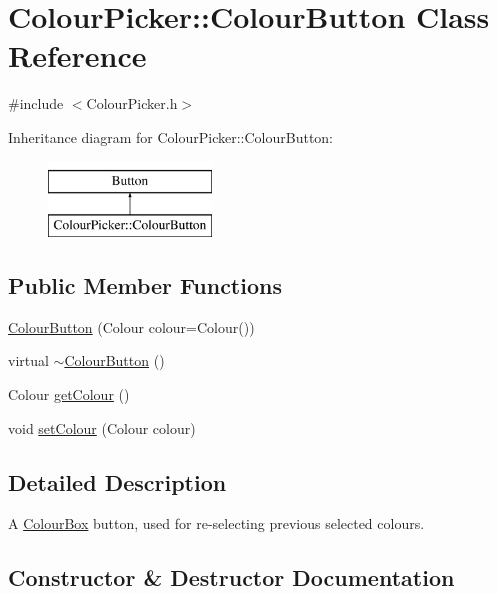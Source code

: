 \hypertarget{classColourPicker_1_1ColourButton}{}\section{Colour\+Picker\+:\+:Colour\+Button Class Reference}
\label{classColourPicker_1_1ColourButton}


{\ttfamily \#include $<$Colour\+Picker.\+h$>$}

Inheritance diagram for Colour\+Picker\+:\+:Colour\+Button\+:\begin{figure}[H]
\begin{center}
\leavevmode
\includegraphics[height=2.000000cm]{classColourPicker_1_1ColourButton}
\end{center}
\end{figure}
\subsection*{Public Member Functions}
\begin{DoxyCompactItemize}
\item 
\mbox{\hyperlink{classColourPicker_1_1ColourButton_a41e4ab540c3c4e77af02b5893d77838f}{Colour\+Button}} (Colour colour=Colour())
\item 
virtual \mbox{\hyperlink{classColourPicker_1_1ColourButton_a3c99f25e8d600d8793d99a948ae27fc2}{$\sim$\+Colour\+Button}} ()
\item 
Colour \mbox{\hyperlink{classColourPicker_1_1ColourButton_a6dc762086e31bc49909e396fc09b4940}{get\+Colour}} ()
\item 
void \mbox{\hyperlink{classColourPicker_1_1ColourButton_aa7fc429f8a2374de5c09af1ef8ddc3ae}{set\+Colour}} (Colour colour)
\end{DoxyCompactItemize}


\subsection{Detailed Description}
A \mbox{\hyperlink{classColourPicker_1_1ColourBox}{Colour\+Box}} button, used for re-\/selecting previous selected colours. 

\subsection{Constructor \& Destructor Documentation}
\mbox{\label{classColourPicker_1_1ColourButton_a41e4ab540c3c4e77af02b5893d77838f}} 
